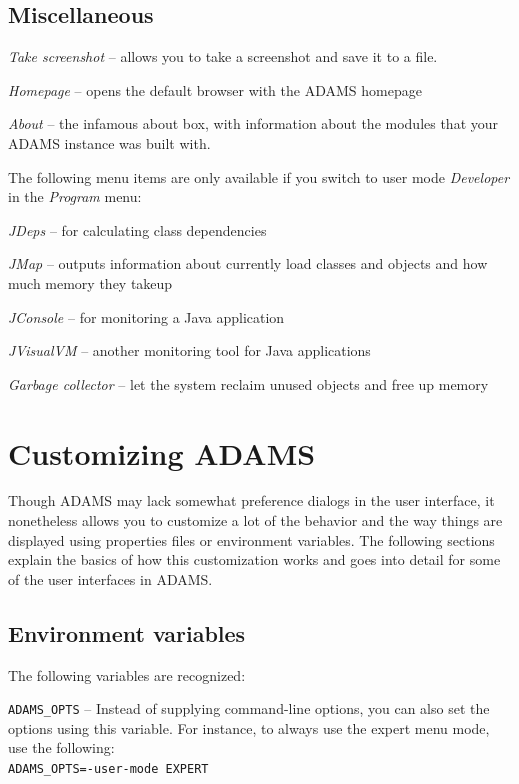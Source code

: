 \clearpage
\section{Miscellaneous}
\begin{tight_itemize}
  \item \textit{Take screenshot} -- allows you to take a screenshot and save it
  to a file.
  \item \textit{Homepage} -- opens the default browser with the ADAMS homepage
  \item \textit{About} -- the infamous about box, with information about the
  modules that your ADAMS instance was built with.
\end{tight_itemize}

The following menu items are only available if you switch to user mode
\textit{Developer} in the \textit{Program} menu:
\begin{tight_itemize}
  \item \textit{JDeps} -- for calculating class dependencies
  \item \textit{JMap} -- outputs information about currently load classes and
  objects and how much memory they takeup
  \item \textit{JConsole} -- for monitoring a Java application
  \item \textit{JVisualVM} -- another monitoring tool for Java applications
  \item \textit{Garbage collector} -- let the system reclaim unused objects
  and free up memory
\end{tight_itemize}


\chapter{Customizing ADAMS}
Though ADAMS may lack somewhat preference dialogs in the user interface, it
nonetheless allows you to customize a lot of the behavior and the way things
are displayed using properties files or environment variables. The following
sections explain the basics of how this customization works and goes into
detail for some of the user interfaces in ADAMS.

\section{Environment variables}
The following variables are recognized:
\begin{tight_itemize}
	\item \texttt{ADAMS\_OPTS} -- Instead of supplying command-line options,
	you can also set the options using this variable. For instance, to always
	use the expert menu mode, use the following:\\
	\texttt{ADAMS\_OPTS=-user-mode EXPERT}
\end{tight_itemize}

